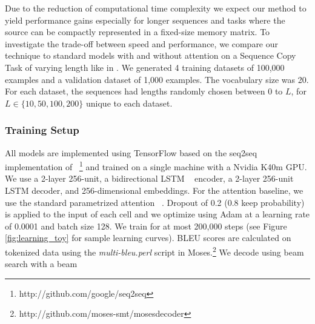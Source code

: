 \documentclass[11pt,letterpaper]{article}
\begin{document}
Due to the reduction of computational time complexity we expect our method to yield performance gains especially for longer sequences and tasks where the source can be compactly represented in a fixed-size memory matrix. To investigate the trade-off between speed and performance, we compare our technique to standard models with and without attention on a Sequence Copy Task of varying length like in \citet{Graves:2014}. We generated 4 training datasets of 100,000 examples and a validation dataset of 1,000 examples. The vocabulary size was 20. For each dataset, the sequences had lengths randomly chosen between 0 to $L$, for $L\in \{10, 50, 100, 200\}$ unique to each dataset.

\subsubsection{Training Setup}

All models are implemented using TensorFlow based on the seq2seq implementation of ~\citet{Britz:2017}\footnote{http://github.com/google/seq2seq} and trained on a single machine with a Nvidia K40m GPU. We use a 2-layer 256-unit, a bidirectional LSTM ~\cite{Schmidhuber:1997} encoder, a 2-layer 256-unit LSTM decoder, and 256-dimensional embeddings. For the attention baseline, we use the standard parametrized attention ~\cite{Bahdanau:2014}. Dropout of 0.2 (0.8 keep probability) is applied to the input of each cell and we optimize using Adam \cite{Kingma:2014} at a learning rate of 0.0001 and batch size 128. We train for at most 200,000 steps (see Figure \ref{fig:learning_toy} for sample learning curves). BLEU scores are calculated on tokenized data using the \textit{multi-bleu.perl} script in Moses.\footnote{http://github.com/moses-smt/mosesdecoder} We decode using beam search with a beam
\end{document}
